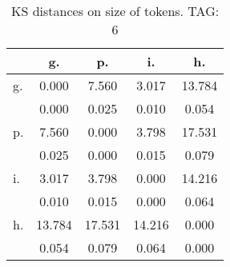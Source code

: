 \begin{table}[h!]
\begin{center}
\begin{tabular}{| l | c | c | c | c |}\hline
 & g. & p. & i. & h. \\\hline
g. & 0.000  & 7.560  & 3.017  & 13.784 \\\hline
 & 0.000  & 0.025  & 0.010  & 0.054 \\\hline
p. & 7.560  & 0.000  & 3.798  & 17.531 \\\hline
 & 0.025  & 0.000  & 0.015  & 0.079 \\\hline
i. & 3.017  & 3.798  & 0.000  & 14.216 \\\hline
 & 0.010  & 0.015  & 0.000  & 0.064 \\\hline
h. & 13.784  & 17.531  & 14.216  & 0.000 \\\hline
 & 0.054  & 0.079  & 0.064  & 0.000 \\\hline
\end{tabular}
\caption{KS distances on size of tokens. TAG: 6}
\end{center}
\end{table}
